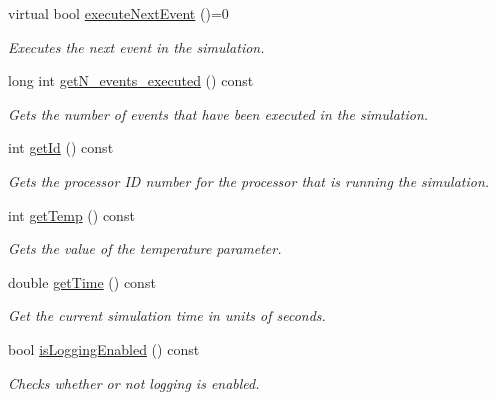 \begin{DoxyCompactItemize}
virtual bool \hyperlink{class_simulation_a48e9e82f9dac1acec5d063a9f6f6115e}{execute\+Next\+Event} ()=0
\begin{DoxyCompactList}\small\item\em Executes the next event in the simulation. \end{DoxyCompactList}\item 
\mbox{\label{class_simulation_a52cb5564151421cbefaca56357738de7}} 
long int \hyperlink{class_simulation_a52cb5564151421cbefaca56357738de7}{get\+N\+\_\+events\+\_\+executed} () const
\begin{DoxyCompactList}\small\item\em Gets the number of events that have been executed in the simulation. \end{DoxyCompactList}\item 
int \hyperlink{class_simulation_aff40f268758bd9a0f390a649fc45c05e}{get\+Id} () const
\begin{DoxyCompactList}\small\item\em Gets the processor ID number for the processor that is running the simulation. \end{DoxyCompactList}\item 
\mbox{\label{class_simulation_ac00bce7c792fb67a75395c46c03efe0a}} 
int \hyperlink{class_simulation_ac00bce7c792fb67a75395c46c03efe0a}{get\+Temp} () const
\begin{DoxyCompactList}\small\item\em Gets the value of the temperature parameter. \end{DoxyCompactList}\item 
\mbox{\label{class_simulation_a391ac262089c8bda8e76ce930b1db88b}} 
double \hyperlink{class_simulation_a391ac262089c8bda8e76ce930b1db88b}{get\+Time} () const
\begin{DoxyCompactList}\small\item\em Get the current simulation time in units of seconds. \end{DoxyCompactList}\item 
bool \hyperlink{class_simulation_ac7c8a49a4cc506b850891480e0aae512}{is\+Logging\+Enabled} () const
\begin{DoxyCompactList}\small\item\em Checks whether or not logging is enabled. \end{DoxyCompactList}\item 

\end{DoxyCompactItemize}
